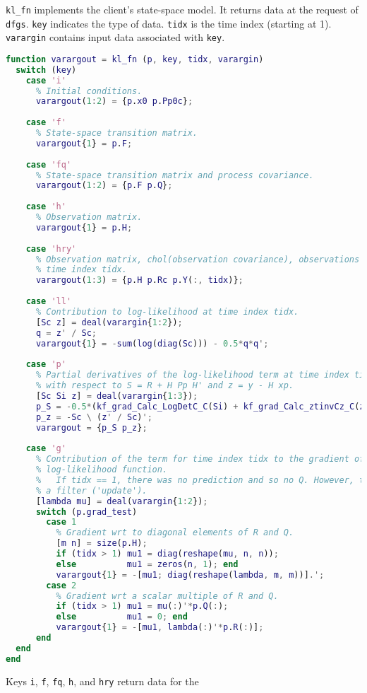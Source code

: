 \documentclass[10pt,fleqn]{article}
\begin{document}
{\tt kl\_fn} implements the client's state-space model. It returns data at the
request of {\tt dfgs}. {\tt key} indicates the type of data. {\tt tidx} is the
time index (starting at 1). {\tt varargin} contains input data associated with
{\tt key}.
\begin{lstlisting}[language=matlab,basicstyle=\footnotesize]
function varargout = kl_fn (p, key, tidx, varargin)
  switch (key)
    case 'i'
      % Initial conditions.
      varargout(1:2) = {p.x0 p.Pp0c};
      
    case 'f'
      % State-space transition matrix.
      varargout{1} = p.F;
      
    case 'fq'
      % State-space transition matrix and process covariance.
      varargout(1:2) = {p.F p.Q};
      
    case 'h'
      % Observation matrix.
      varargout{1} = p.H;
      
    case 'hry'
      % Observation matrix, chol(observation covariance), observations at
      % time index tidx.
      varargout(1:3) = {p.H p.Rc p.Y(:, tidx)};
      
    case 'll'
      % Contribution to log-likelihood at time index tidx.
      [Sc z] = deal(varargin{1:2});
      q = z' / Sc;
      varargout{1} = -sum(log(diag(Sc))) - 0.5*q*q';
      
    case 'p'
      % Partial derivatives of the log-likelihood term at time index tidx
      % with respect to S = R + H Pp H' and z = y - H xp.
      [Sc Si z] = deal(varargin{1:3});
      p_S = -0.5*(kf_grad_Calc_LogDetC_C(Si) + kf_grad_Calc_ztinvCz_C(z, Sc));
      p_z = -Sc \ (z' / Sc)';
      varargout = {p_S p_z};
      
    case 'g'
      % Contribution of the term for time index tidx to the gradient of the
      % log-likelihood function.
      %   If tidx == 1, there was no prediction and so no Q. However, there was
      % a filter ('update').
      [lambda mu] = deal(varargin{1:2});
      switch (p.grad_test)
        case 1
          % Gradient wrt to diagonal elements of R and Q.
          [m n] = size(p.H);
          if (tidx > 1) mu1 = diag(reshape(mu, n, n));
          else          mu1 = zeros(n, 1); end
          varargout{1} = -[mu1; diag(reshape(lambda, m, m))].';
        case 2
          % Gradient wrt a scalar multiple of R and Q.
          if (tidx > 1) mu1 = mu(:)'*p.Q(:);
          else          mu1 = 0; end
          varargout{1} = -[mu1, lambda(:)'*p.R(:)];
      end
  end
end
\end{lstlisting}
Keys {\tt i}, {\tt f}, {\tt fq}, {\tt h}, and {\tt hry} return data for the
\end{document}
